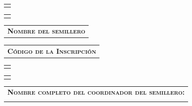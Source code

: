 \documentclass[12pt]{report}
\begin{document}
\begin{minipage}{\textwidth}
	\begin{tabular}{l}
		\begin{minipage}[t]{0.65\textwidth}%
			\cellcolor{white!10}{\today}
		\end{minipage}
	\end{tabular}	
	\begin{tabular}{c}
		\begin{minipage}[t]{0.325\textwidth}
			\centering
			\cellcolor{white!10}{\currenttime}
		\end{minipage}
	\end{tabular}	
\end{minipage}

\begin{minipage}{\textwidth}
	\begin{tabular}{l}
		\begin{minipage}[t]{0.65\textwidth}%
			\cellcolor{blue!10}\textsc{\textbf{Nombre del semillero}}
		\end{minipage}
	\end{tabular}	
	\begin{tabular}{l}
		\begin{minipage}[t]{0.325\textwidth}%
			\centering
			\cellcolor{blue!10}\textsc{\textbf{Código de la Inscripción}}
		\end{minipage}
	\end{tabular}	
\end{minipage}

\begin{minipage}{\textwidth}
	\begin{tabular}{l}
		\begin{minipage}[t]{0.65\textwidth}%
			\cellcolor{white!10}{\hotbed}
		\end{minipage}
	\end{tabular}	
	\begin{tabular}{c}
		\begin{minipage}[t]{0.325\textwidth}
			\centering
			\cellcolor{white!10}\textbf{\code}
		\end{minipage}
	\end{tabular}	
\end{minipage}

\begin{minipage}{\textwidth}
	\begin{tabular}{l}
		\begin{minipage}[t]{\textwidth}%
			\cellcolor{blue!10}\textsc{\textbf{Nombre completo del coordinador del semillero:}}
		\end{minipage}
		\vspace{0.1cm}\\
		\begin{minipage}[t]{\textwidth}%
			\cellcolor{white!10}{\leader}
		\end{minipage}
	\end{tabular}	
\end{minipage}
\end{document}
